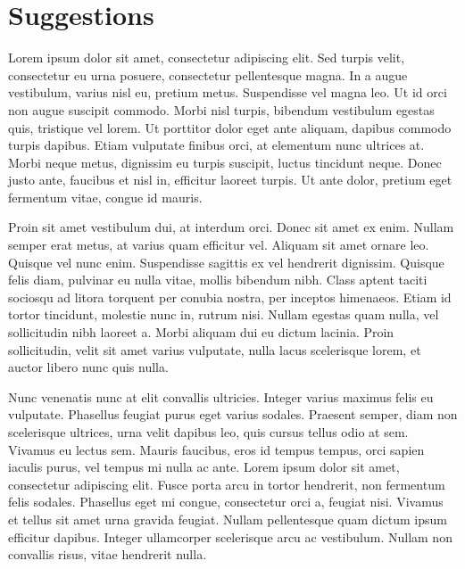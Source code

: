\documentclass[
10pt, %
a4paper, %
oneside, %
headinclude,footinclude, %
]{article}
\begin{document}
 

\section{Suggestions}

Lorem ipsum dolor sit amet, consectetur adipiscing elit. Sed turpis velit, consectetur eu urna posuere, consectetur pellentesque magna. In a augue vestibulum, varius nisl eu, pretium metus. Suspendisse vel magna leo. Ut id orci non augue suscipit commodo. Morbi nisl turpis, bibendum vestibulum egestas quis, tristique vel lorem. Ut porttitor dolor eget ante aliquam, dapibus commodo turpis dapibus. Etiam vulputate finibus orci, at elementum nunc ultrices at. Morbi neque metus, dignissim eu turpis suscipit, luctus tincidunt neque. Donec justo ante, faucibus et nisl in, efficitur laoreet turpis. Ut ante dolor, pretium eget fermentum vitae, congue id mauris.

Proin sit amet vestibulum dui, at interdum orci. Donec sit amet ex enim. Nullam semper erat metus, at varius quam efficitur vel. Aliquam sit amet ornare leo. Quisque vel nunc enim. Suspendisse sagittis ex vel hendrerit dignissim. Quisque felis diam, pulvinar eu nulla vitae, mollis bibendum nibh. Class aptent taciti sociosqu ad litora torquent per conubia nostra, per inceptos himenaeos. Etiam id tortor tincidunt, molestie nunc in, rutrum nisi. Nullam egestas quam nulla, vel sollicitudin nibh laoreet a. Morbi aliquam dui eu dictum lacinia. Proin sollicitudin, velit sit amet varius vulputate, nulla lacus scelerisque lorem, et auctor libero nunc quis nulla.

Nunc venenatis nunc at elit convallis ultricies. Integer varius maximus felis eu vulputate. Phasellus feugiat purus eget varius sodales. Praesent semper, diam non scelerisque ultrices, urna velit dapibus leo, quis cursus tellus odio at sem. Vivamus eu lectus sem. Mauris faucibus, eros id tempus tempus, orci sapien iaculis purus, vel tempus mi nulla ac ante. Lorem ipsum dolor sit amet, consectetur adipiscing elit. Fusce porta arcu in tortor hendrerit, non fermentum felis sodales. Phasellus eget mi congue, consectetur orci a, feugiat nisi. Vivamus et tellus sit amet urna gravida feugiat. Nullam pellentesque quam dictum ipsum efficitur dapibus. Integer ullamcorper scelerisque arcu ac vestibulum. Nullam non convallis risus, vitae hendrerit nulla.
\end{document}
